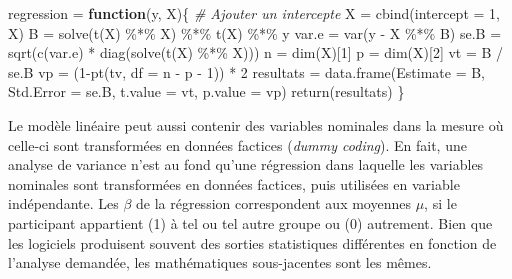 \documentclass[
]{book}
\newenvironment{Shaded}{}{}
\newcommand{\AttributeTok}[1]{#1}
\newcommand{\CommentTok}[1]{\textit{#1}}
\newcommand{\ControlFlowTok}[1]{\textbf{#1}}
\newcommand{\DecValTok}[1]{#1}
\newcommand{\FunctionTok}[1]{#1}
\newcommand{\NormalTok}[1]{#1}
\newcommand{\OtherTok}[1]{#1}
\newcommand{\SpecialCharTok}[1]{#1}
\begin{document}
\begin{Shaded}
\begin{Highlighting}[]
\NormalTok{regression }\OtherTok{=} \ControlFlowTok{function}\NormalTok{(y, X)\{}
  \CommentTok{\# Ajouter un intercepte}
\NormalTok{  X }\OtherTok{=} \FunctionTok{cbind}\NormalTok{(}\AttributeTok{intercept =} \DecValTok{1}\NormalTok{, X)}
\NormalTok{  B }\OtherTok{=} \FunctionTok{solve}\NormalTok{(}\FunctionTok{t}\NormalTok{(X) }\SpecialCharTok{\%*\%}\NormalTok{ X) }\SpecialCharTok{\%*\%} \FunctionTok{t}\NormalTok{(X) }\SpecialCharTok{\%*\%}\NormalTok{ y}
\NormalTok{  var.e }\OtherTok{=} \FunctionTok{var}\NormalTok{(y }\SpecialCharTok{{-}}\NormalTok{ X }\SpecialCharTok{\%*\%}\NormalTok{ B) }
\NormalTok{  se.B }\OtherTok{=} \FunctionTok{sqrt}\NormalTok{(}\FunctionTok{c}\NormalTok{(var.e) }\SpecialCharTok{*} \FunctionTok{diag}\NormalTok{(}\FunctionTok{solve}\NormalTok{(}\FunctionTok{t}\NormalTok{(X) }\SpecialCharTok{\%*\%}\NormalTok{ X)))}
\NormalTok{  n }\OtherTok{=} \FunctionTok{dim}\NormalTok{(X)[}\DecValTok{1}\NormalTok{]}
\NormalTok{  p }\OtherTok{=} \FunctionTok{dim}\NormalTok{(X)[}\DecValTok{2}\NormalTok{]}
\NormalTok{  vt }\OtherTok{=}\NormalTok{ B }\SpecialCharTok{/}\NormalTok{ se.B}
\NormalTok{  vp }\OtherTok{=}\NormalTok{ (}\DecValTok{1}\SpecialCharTok{{-}}\FunctionTok{pt}\NormalTok{(tv, }\AttributeTok{df =}\NormalTok{ n }\SpecialCharTok{{-}}\NormalTok{ p }\SpecialCharTok{{-}} \DecValTok{1}\NormalTok{)) }\SpecialCharTok{*} \DecValTok{2}
\NormalTok{  resultats }\OtherTok{=} \FunctionTok{data.frame}\NormalTok{(}\AttributeTok{Estimate =}\NormalTok{ B, }
                         \AttributeTok{Std.Error =}\NormalTok{ se.B, }
                         \AttributeTok{t.value =}\NormalTok{ vt, }
                         \AttributeTok{p.value =}\NormalTok{ vp) }
  \FunctionTok{return}\NormalTok{(resultats)}
\NormalTok{\}  }
\end{Highlighting}
\end{Shaded}

Le modèle linéaire peut aussi contenir des variables nominales dans la mesure où celle-ci sont transformées en données factices (\emph{dummy coding}). En fait, une analyse de variance n'est au fond qu'une régression dans laquelle les variables nominales sont transformées en données factices, puis utilisées en variable indépendante. Les \(\beta\) de la régression correspondent aux moyennes \(\mu\), si le participant appartient (1) à tel ou tel autre groupe ou (0) autrement. Bien que les logiciels produisent souvent des sorties statistiques différentes en fonction de l'analyse demandée, les mathématiques sous-jacentes sont les mêmes.
\end{document}
